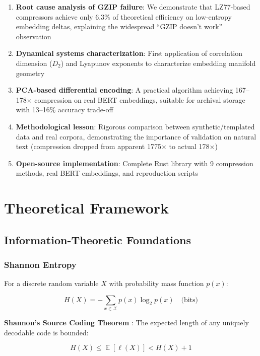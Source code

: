 \documentclass[11pt,a4paper]{article}
\DeclareMathOperator{\E}{\mathbb{E}}
\begin{document}
\begin{enumerate}
\item \textbf{Root cause analysis of GZIP failure}: We demonstrate that LZ77-based compressors achieve only 6.3\% of theoretical efficiency on low-entropy embedding deltas, explaining the widespread ``GZIP doesn't work'' observation
\item \textbf{Dynamical systems characterization}: First application of correlation dimension ($D_2$) and Lyapunov exponents to characterize embedding manifold geometry
\item \textbf{PCA-based differential encoding}: A practical algorithm achieving 167--178$\times$ compression on real BERT embeddings, suitable for archival storage with 13--16\% accuracy trade-off
\item \textbf{Methodological lesson}: Rigorous comparison between synthetic/templated data and real corpora, demonstrating the importance of validation on natural text (compression dropped from apparent 1775$\times$ to actual 178$\times$)
\item \textbf{Open-source implementation}: Complete Rust library with 9 compression methods, real BERT embeddings, and reproduction scripts
\end{enumerate}

\section{Theoretical Framework}

\subsection{Information-Theoretic Foundations}

\subsubsection{Shannon Entropy}

For a discrete random variable $X$ with probability mass function $p(x)$:

\begin{equation}
H(X) = -\sum_{x \in \mathcal{X}} p(x) \log_2 p(x) \quad \text{(bits)}
\end{equation}

\textbf{Shannon's Source Coding Theorem} \cite{shannon1948mathematical}: The expected length of any uniquely decodable code is bounded:

\begin{equation}
H(X) \leq \E[\ell(X)] < H(X) + 1
\end{equation}
\end{document}
